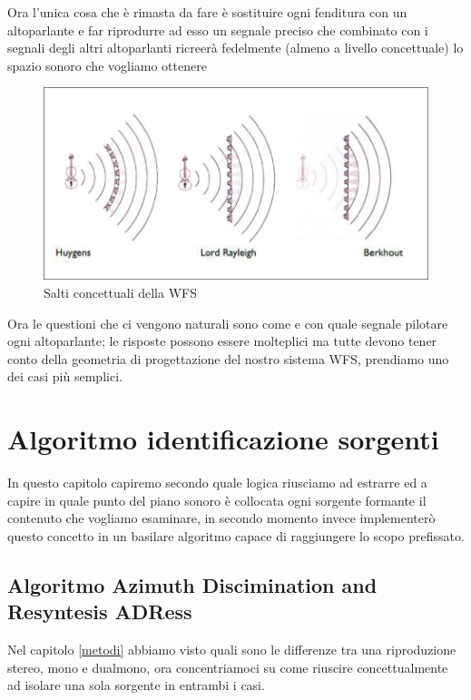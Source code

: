 \documentclass[12pt,a4paper]{report}
\begin{document}
Ora l'unica cosa che è rimasta da fare è sostituire ogni fenditura con un altoparlante e far riprodurre ad esso un  segnale preciso che combinato con i segnali degli altri altoparlanti ricreerà fedelmente (almeno a livello concettuale) lo spazio sonoro che vogliamo ottenere

\begin{figure}[htbp]
	\centering
	\includegraphics[scale=0.55]{figures/wfs.png}
	\caption {Salti concettuali della WFS} 
	\label{fig:wfs}
	\end{figure}
	

Ora le questioni che ci vengono naturali sono come e con quale segnale pilotare ogni altoparlante; le risposte possono essere molteplici ma tutte devono tener conto della geometria di progettazione del nostro sistema WFS, prendiamo uno dei casi più semplici.\\

\chapter{Algoritmo identificazione sorgenti}

In questo capitolo capiremo secondo quale logica riusciamo ad estrarre ed a capire in quale punto del piano sonoro è collocata ogni sorgente formante il contenuto che vogliamo esaminare, in secondo momento invece implementerò questo concetto in un basilare algoritmo capace di raggiungere lo scopo prefissato.

\section{Algoritmo Azimuth Discimination and Resyntesis ADRess} 

Nel capitolo \ref{metodi} abbiamo visto quali sono le differenze tra una riproduzione stereo, mono e dualmono, ora concentriamoci su come riuscire concettualmente ad isolare una sola sorgente in entrambi i casi.\\
\end{document}
